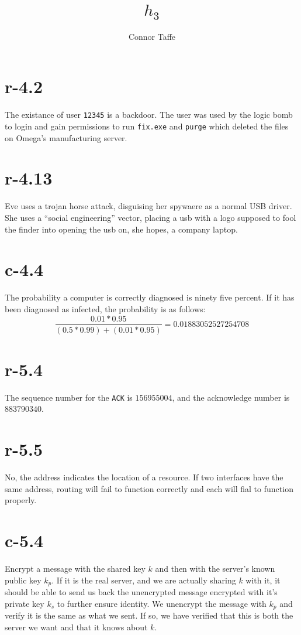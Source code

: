 \documentclass{amsart}
\title{$h_{3}$}
\author{Connor Taffe}
\begin{document}
  \maketitle

  \section{r-4.2}
  The existance of user {\tt 12345} is a backdoor. The user was used by the logic bomb to login and gain permissions to run {\tt fix.exe} and {\tt purge} which deleted the files on Omega's manufacturing server.

  \section{r-4.13}
  Eve uses a trojan horse attack, disguising her spywaere as a normal USB driver. She uses a ``social engineering'' vector, placing a usb with a logo supposed to fool the finder into opening the usb on, she hopes, a company laptop.

  \section{c-4.4}
  The probability a computer is correctly diagnosed is ninety five percent. If it has been diagnosed as infected, the probability is as follows:
   \begin{equation}
     \frac{0.01*0.95}{(0.5*0.99)+(0.01*0.95)} = 0.01883052527254708
   \end{equation}

  \section{r-5.4}
  The sequence number for the {\tt ACK} is $156955004$, and the acknowledge number is $883790340$.

  \section{r-5.5}
  No, the address indicates the location of a resource. If two interfaces have the same address, routing will fail to function correctly and each will fial to function properly.

  \section{c-5.4}
  Encrypt a message with the shared key $k$ and then with the server's known public key $k_{p}$. If it is the real server, and we are actually sharing $k$ with it, it should be able to send us back the unencrypted message encrypted with it's private key $k_{s}$ to further ensure identity. We unencrypt the message with $k_{p}$ and verify it is the same as what we sent. If so, we have verified that this is both the server we want and that it knows about $k$.
\end{document}
